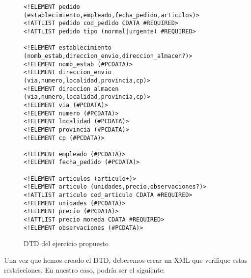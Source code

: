 \begin{figure}[H]
    \begin{tcolorbox}[sharp corners, colback=yellow!30, colframe=white!20]
        \scriptsize
        \begin{verbatim}
<!ELEMENT pedido (establecimiento,empleado,fecha_pedido,articulos)>
<!ATTLIST pedido cod_pedido CDATA #REQUIRED>
<!ATTLIST pedido tipo (normal|urgente) #REQUIRED>

<!ELEMENT establecimiento (nomb_estab,direccion_envio,direccion_almacen?)>
<!ELEMENT nomb_estab (#PCDATA)>
<!ELEMENT direccion_envio (via,numero,localidad,provincia,cp)>
<!ELEMENT direccion_almacen (via,numero,localidad,provincia,cp)>
<!ELEMENT via (#PCDATA)>
<!ELEMENT numero (#PCDATA)>
<!ELEMENT localidad (#PCDATA)>
<!ELEMENT provincia (#PCDATA)>
<!ELEMENT cp (#PCDATA)>

<!ELEMENT empleado (#PCDATA)>
<!ELEMENT fecha_pedido (#PCDATA)>

<!ELEMENT articulos (articulo+)>
<!ELEMENT articulo (unidades,precio,observaciones?)>
<!ATTLIST articulo cod_articulo CDATA #REQUIRED>
<!ELEMENT unidades (#PCDATA)>
<!ELEMENT precio (#PCDATA)>
<!ATTLIST precio moneda CDATA #REQUIRED>
<!ELEMENT observaciones (#PCDATA)>
        \end{verbatim}
    \end{tcolorbox}
    \caption{DTD del ejercicio propuesto}
\end{figure}

Una vez que hemos creado el DTD, deberemos crear un XML que verifique estas restricciones. En nuestro caso, podría ser el siguiente:

